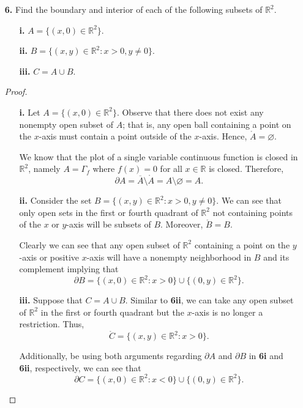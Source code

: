 \documentclass[ 12pt ]{article}
\begin{document}
\begin{enumerate}
	\item[\textbf{6.}] Find the boundary and interior of each of the following subsets of $\mathbb{R}^2$.
		\begin{enumerate}
			\item[\textbf{i.}] $A = \{(x, 0) \in \mathbb{R}^2\}$.
			\item[\textbf{ii.}] $B = \{(x, y) \in \mathbb{R}^2 : x > 0, y \neq 0\}$.
			\item[\textbf{iii.}] $C = A \cup B$.
		\end{enumerate}

		\begin{proof}
			\begin{enumerate}
				\item[\textbf{i.}] Let $A = \{(x, 0) \in \mathbb{R}^2\}$. Observe that there does not exist any nonempty open subset of $A$; that is, any open ball containing a point
					on the $x$-axis must contain a point outside of the $x$-axis. Hence, $\mathring{A} = \varnothing$.

					We know that the plot of a single variable continuous function is closed in $\mathbb{R}^2$, namely $A = \Gamma_f$ where $f(x) = 0$ for all $x \in \mathbb{R}$ is
					closed. Therefore, $$\partial A = \overline{A} \setminus \mathring{A} = A \setminus \varnothing = A.$$

				\item[\textbf{ii.}] Consider the set $B = \{(x, y) \in \mathbb{R}^2 : x > 0, y \neq 0\}$. We can see that only open sets in the first or fourth quadrant of $\mathbb{R}^2$
					not containing points of the $x$ or $y$-axis will be subsets of $B$. Moreover, $\mathring{B} = B$.

					Clearly we can see that any open subset of $\mathbb{R}^2$ containing a point on the $y$-axis or positive $x$-axis will have a nonempty neighborhood in $B$ and its
					complement implying that $$\partial B = \{ (x, 0) \in \mathbb{R}^2 : x > 0\} \cup \{(0, y) \in \mathbb{R}^2\}.$$

				\item[\textbf{iii.}] Suppose that $C = A \cup B$. Similar to \textbf{6ii}, we can take any open subset of $\mathbb{R}^2$ in the first or fourth quadrant but the $x$-axis
					is no longer a restriction. Thus, $$\mathring{C} = \{(x, y) \in \mathbb{R}^2 : x > 0\}.$$

					Additionally, be using both arguments regarding $\partial A$ and $\partial B$ in \textbf{6i} and \textbf{6ii}, respectively, we can see that $$\partial C = \{
					(x, 0) \in \mathbb{R}^2 : x < 0\} \cup \{ (0, y) \in \mathbb{R}^2 \}.$$
			\end{enumerate}
		\end{proof}



\end{enumerate}
\end{document}
